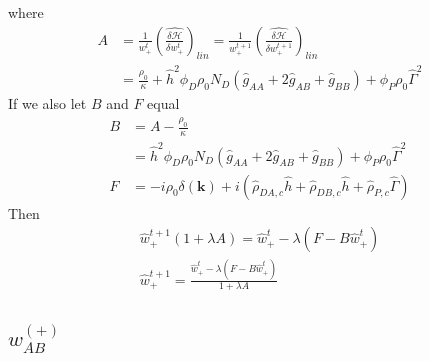 \documentclass{article}
\begin{document}
  where
  \begin{align*}
    A &=
    \frac{1}{w_+^t}
    \left( \hat{\frac{\delta \mathcal{H}}{\delta w_+^t}} \right) _{lin}
    =
    \frac{1}{w_+^{t+1}}
    \left( \hat{\frac{\delta \mathcal{H}}{\delta w_+^{t+1}}} \right) _{lin} \\
    &=
    \frac{\rho_0}{\kappa}
        + \hat{h}^2 \phi_D \rho_0 N_D
          (\hat{g}_{AA} + 2 \hat{g}_{AB} + \hat{g}_{BB})
        + \phi_P \rho_0 \hat{\Gamma}^2
  \end{align*}
  If we also let $B$ and $F$ equal
  \begin{align*}
    B &= A - \frac{\rho_0}{\kappa} \\
      &= \hat{h}^2 \phi_D \rho_0 N_D
          (\hat{g}_{AA} + 2 \hat{g}_{AB} + \hat{g}_{BB})
        + \phi_P \rho_0 \hat{\Gamma}^2 \\
    F &= - i \rho_0 \delta (\mathbf{k})
         + i ( \hat{\rho}_{DA,c} \hat{h}
              + \hat{\rho}_{DB,c} \hat{h}
              + \hat{\rho}_{P,c}  \hat{\Gamma} )
  \end{align*}
  Then
  \begin{align*}
    \hat{w}_+^{t+1} ( 1 + \lambda A ) =
    \hat{w}_+^t - \lambda \left( F - B \hat{w}_+^t \right) \\
    \hat{w}_+^{t+1} =
    \frac{\hat{w}_+^t - \lambda \left( F - B \hat{w}_+^t \right)}
         {1 + \lambda A}
  \end{align*}
  
  \subsection{$w_{AB}^{(+)}$}
  
\end{document}
